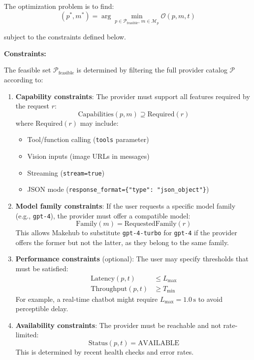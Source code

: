 \documentclass[english]{article}
\begin{document}
The optimization problem is to find:
\begin{equation}
(p^*, m^*) = \arg\min_{p \in \mathcal{P}_{\text{feasible}}, \, m \in \mathcal{M}_p} \mathcal{O}(p, m, t)
\end{equation}

subject to the constraints defined below.

\medskip

\noindent\textbf{Constraints:}

The feasible set $\mathcal{P}_{\text{feasible}}$ is determined by filtering the full provider catalog $\mathcal{P}$ according to:

\begin{enumerate}
\item \textbf{Capability constraints}: The provider must support all features required by the request $r$:
  \begin{equation}
  \text{Capabilities}(p, m) \supseteq \text{Required}(r)
  \end{equation}
  where $\text{Required}(r)$ may include:
  \begin{itemize}
    \item Tool/function calling (\texttt{tools} parameter)
    \item Vision inputs (image URLs in messages)
    \item Streaming (\texttt{stream=true})
    \item JSON mode (\texttt{response\_format=\{"type": "json\_object"\}})
  \end{itemize}

\item \textbf{Model family constraints}: If the user requests a specific model family (e.g., \texttt{gpt-4}), the provider must offer a compatible model:
  \begin{equation}
  \text{Family}(m) = \text{RequestedFamily}(r)
  \end{equation}
  This allows Makehub to substitute \texttt{gpt-4-turbo} for \texttt{gpt-4} if the provider offers the former but not the latter, as they belong to the same family.

\item \textbf{Performance constraints} (optional): The user may specify thresholds that must be satisfied:
  \begin{align}
  \text{Latency}(p, t) &\leq L_{\text{max}} \\
  \text{Throughput}(p, t) &\geq T_{\text{min}}
  \end{align}
  For example, a real-time chatbot might require $L_{\text{max}} = 1.0\,\text{s}$ to avoid perceptible delay.

\item \textbf{Availability constraints}: The provider must be reachable and not rate-limited:
  \begin{equation}
  \text{Status}(p, t) = \text{AVAILABLE}
  \end{equation}
  This is determined by recent health checks and error rates.
\end{enumerate}
\end{document}
